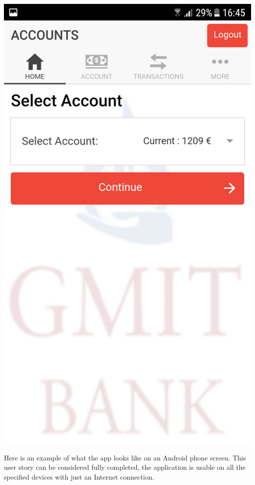 \begin{itemize}
\begin{enumerate}
\begin{itemize}
            \end{itemize}
\begin{center}
    \includegraphics[scale=0.5]{img/7homepageaccount.png}
\end{center}
            Here is an example of what the app looks like on an Android phone screen.
            This user story can be considered fully completed, the application is usable on all the specified devices with just an Internet connection.
        \end{enumerate}

\end{itemize}
